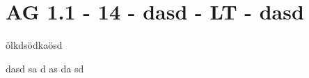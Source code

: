 \section{AG 1.1 - 14 - dasd - LT - dasd}

\begin{beispiel}{4} %
 ölkdsödkaösd
 
 dasd
 sa
 d
 as
 da
 sd
\end{beispiel}